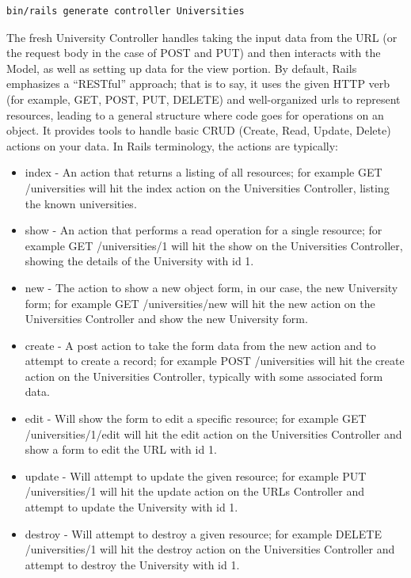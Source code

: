 \begin{lstlisting}[style=nonumbers, caption={Generate controller University},label={university-controller-new}]
bin/rails generate controller Universities
\end{lstlisting}
\bigskip

The fresh University Controller handles taking the input data from the URL (or the request body in the case of POST and PUT) and then interacts with the Model, as well as setting up data for the view portion. By default, Rails emphasizes a “RESTful” approach; that is to say, it uses the given HTTP verb (for example, GET, POST, PUT, DELETE) and well-organized urls to represent resources, leading to a general structure where code goes for operations on an object. It provides tools to handle basic CRUD (Create, Read, Update, Delete) actions on your data. In Rails terminology, the actions are typically:
\begin{itemize}
\item index - An action that returns a listing of all resources; for example GET /universities will hit the index action on the Universities Controller, listing the known universities.
\item show - An action that performs a read operation for a single resource; for example GET /universities/1 will hit the show on the Universities Controller, showing the details of the University with id 1.
\item new - The action to show a new object form, in our case, the new University form; for example GET /universities/new will hit the new action on the Universities Controller and show the new University form.
\item create - A post action to take the form data from the new action and to attempt to create a record; for example POST /universities will hit the create action on the Universities Controller, typically with some associated form data.
\item edit - Will show the form to edit a specific resource; for example GET /universities/1/edit will hit the edit action on the Universities Controller and show a form to edit the URL with id 1.
\item update - Will attempt to update the given resource; for example PUT /universities/1 will hit the update action on the URLs Controller and attempt to update the University with id 1.
\item destroy - Will attempt to destroy a given resource; for example DELETE /universities/1 will hit the destroy action on the Universities Controller and attempt to destroy the University with id 1.
\end{itemize}

